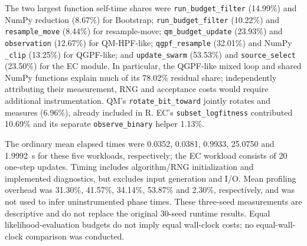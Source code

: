 The two largest function self-time shares were \texttt{run\_budget\_filter}
(14.99\%) and NumPy reduction (8.67\%) for Bootstrap;
\texttt{run\_budget\_filter} (10.22\%) and \texttt{resample\_move} (8.44\%)
for resample-move; \texttt{qm\_budget\_update} (23.93\%) and
\texttt{observation} (12.67\%) for QM-HPF-like;
\texttt{qgpf\_resample} (32.01\%) and NumPy \texttt{\_clip} (13.25\%)
for QGPF-like; and \texttt{update\_swarm} (53.53\%) and
\texttt{source\_select} (23.50\%) for the EC module. In particular,
the QGPF-like mixed loop and shared NumPy functions explain much of its
78.02\% residual share; independently attributing their measurement, RNG
and acceptance costs would require additional instrumentation.
QM's \texttt{rotate\_bit\_toward} jointly rotates and measures (6.96\%),
already included in R. EC's \texttt{subset\_logfitness} contributed 10.69\%
and its separate \texttt{observe\_binary} helper 1.13\%.

The ordinary mean elapsed times were 0.0352, 0.0381, 0.9933, 25.0750 and
1.9992~s for these five workloads, respectively; the EC workload consists
of 20 one-step updates. Timing includes algorithm/RNG initialization and
implemented diagnostics, but excludes input generation and I/O. Mean
profiling overhead was 31.30\%, 41.57\%, 34.14\%, 53.87\% and 2.30\%,
respectively, and was not used to infer uninstrumented phase times. These
three-seed measurements are descriptive and do not replace the original
30-seed runtime results. Equal likelihood-evaluation budgets do not imply
equal wall-clock costs; no equal-wall-clock comparison was conducted.

